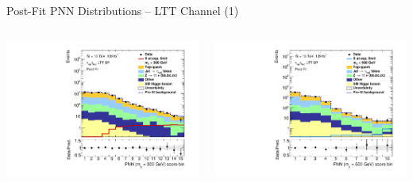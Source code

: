 \documentclass[11pt, xcolor={dvipsnames}, aspectratio=169]{beamer}
\begin{document}

\begin{frame}{Post-Fit PNN Distributions -- \allbold{\lephad} LTT Channel (1)}
  \begin{columns}
    \centering


    \includegraphics[width=\textwidth]{results_res/postfit/Region_BMin0_incJet1_dist300_J2_D2HDMPNN_T2_SpcTauLH_Y2015_LTT1_L1_GlobalFit_conditionnal_mu0log}

    \centering


    \includegraphics[width=\textwidth]{results_res/postfit/Region_BMin0_incJet1_dist500_J2_D2HDMPNN_T2_SpcTauLH_Y2015_LTT1_L1_GlobalFit_conditionnal_mu0log}


\end{columns}
\end{frame}
\end{document}

